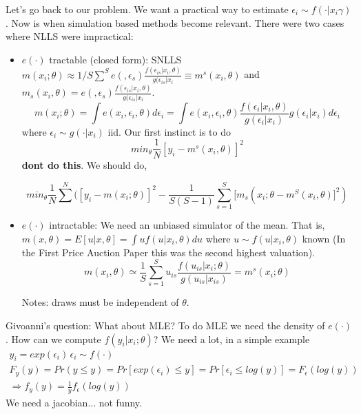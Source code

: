 \documentclass[12pt]{article}
\begin{document}
	Let's go back to our problem. We want a practical way to estimate $\epsilon_i \sim f(\cdot | x_i \gamma )$. Now is when simulation based methods become relevant. There were two cases where NLLS were impractical:
	\begin{itemize}
		\item $e(\cdot)$ tractable (closed form): SNLLS $m(x_i; \theta) \approx 1/S \sum^S e(, \epsilon_s ) \frac{f(\epsilon_{is} | x_i , \theta)}{ g(\epsilon_{is} | x_i} \equiv m^s(x_i,\theta)$ and $m_s(x_i,\theta) = e(, \epsilon_s ) \frac{f(\epsilon_{is} | x_i , \theta)}{ g(\epsilon_{is} | x_i}$. 
		\begin{equation}
			m(x_i;\theta) = \int e(x_i, \epsilon_i, \theta) d \epsilon_i = \int e(x_i, \epsilon_i, \theta) \frac{f(\epsilon_i | x_i, \theta)}{g(\epsilon_i | x_i)} g(\epsilon_i | x_i) d \epsilon_i
		\end{equation}
		where $\epsilon_i \sim g(\cdot | x_i)$ iid. Our first instinct is to do
		\begin{equation}
			min_\theta \frac{1}{N} [y_i - m^s(x_i, \theta)]^2
		\end{equation}
		\textbf{dont do this}. We should do, 
		
		\begin{equation}
			min_\theta \frac{1}{N} \sum^N ( [y_i - m(x_i; \theta)]^2 - \frac{1}{S(S-1)} \sum^S_{s = 1} [m_s(x_i;\theta - m^S(x_i,\theta)]^2 )
		\end{equation}
	
	\item $e(\cdot)$ intractable: We need an unbiased simulator of the mean. That is, $m(x,\theta) = E[u | x, \theta] = \int u f(u|x_i,\theta) du$ where $u \sim f(u|x_i,\theta)$ known (In the First Price Auction Paper this was the second highest valuation). 
		\begin{equation}
			m(x_i, \theta) \simeq \frac{1}{S} \sum^S_{s = 1} u_{is} \frac{f(u_{is} |x_i; \theta) }{g(u_{is} | x_{is} )} = m^s(x_i;\theta) 
		\end{equation} 
		
		Notes: draws must be independent of $\theta$. 
	\end{itemize}
	
	Givoanni's question: What about MLE? To do MLE we need the density of $e(\cdot)$. How can we compute $f(y_i|x_i;\theta)$? We need a lot, in a simple example 
	\begin{eqnarray*}
		y_i = exp(\epsilon_i) \, \epsilon_i \sim f(\cdot) \\
		F_y(y) = Pr(y \leq y) = Pr[exp(\epsilon_i) \leq y] = Pr[\epsilon_i \leq log(y)] = F_\epsilon (log(y)) \\
		\Rightarrow f_y (y) = \frac{1}{y} f_\epsilon(log(y))
	\end{eqnarray*}
	We need a jacobian... not funny. 
	
\end{document}
